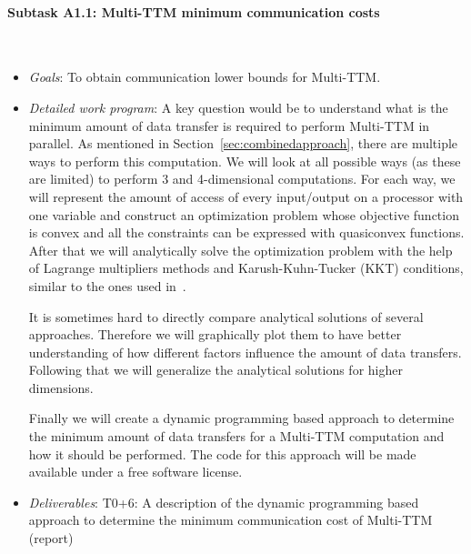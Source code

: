 \documentclass[a4paper,11pt]{article}
\newcommand{\subtask}[1]{{\color{orange}\paragraph{#1}$ $}}
\newcommand{\goal}{{\color{orange2}  \emph{Goals}:} }
\newcommand{\dwp}{{\color{orange2}  \emph{Detailed work program}: }}
\newcommand{\deliverables}{{\color{orange2}  \emph{Deliverables}: }}
\begin{document}
	\subtask{Subtask A1.1: Multi-TTM minimum communication costs}
	\begin{itemize}[leftmargin=-1pt]
		\item[] \goal To obtain communication lower bounds for Multi-TTM.
		\item[] \dwp A key question would be to understand what is the minimum amount of data transfer is required to perform Multi-TTM in parallel. As mentioned in Section~\ref{sec:combinedapproach}, there are multiple ways to perform this computation. We will look at all possible ways (as these are limited) to perform 3 and 4-dimensional computations. For each way, we will represent the amount of access of every input/output on a processor with one variable and construct an optimization problem whose objective function is convex and all the constraints can be expressed with quasiconvex functions. After that we will analytically solve the optimization problem with the help of Lagrange multipliers methods and Karush-Kuhn-Tucker (KKT) conditions, similar to the ones used in~\cite{ABGKR-SIMAX-2024}.
		
		
		It is sometimes hard to directly compare analytical solutions of several approaches. Therefore we will graphically plot them to have better understanding of how different factors influence the amount of data transfers. Following that we will generalize the analytical solutions for higher dimensions. 
		
		Finally we will create a dynamic programming based approach to determine the minimum amount of data transfers for a Multi-TTM computation and how it should be performed. The code for this approach will be made available under a free software license.
		
		\item[] \deliverables T0+6: A description of the dynamic programming based approach to determine the minimum communication cost of Multi-TTM (report)
	\end{itemize}
	
\end{document}
